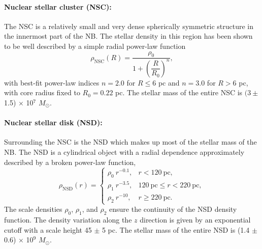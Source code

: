 \documentclass[doublespace,nopageskip]{VTthesis} %
\begin{document}
\paragraph{Nuclear stellar cluster (NSC):} The NSC is a relatively small and very dense spherically symmetric structure in the innermost part of the NB. The stellar density in this region has been shown~\cite{2002A&A...384..112L} to be well described by a simple radial power-law function
\begin{equation}\label{eq:NSC}
  \rho_{\text{NSC}}(R)=\dfrac{\rho_0}{1+\left(\dfrac{R}{R_0}\right)^{n}},
\end{equation}
with best-fit power-law indices $n = 2.0$ for $R \leq 6$ pc and $n = 3.0$ for $R > 6$ pc, with core radius fixed to $R_0 = 0.22$ pc. The stellar mass of the entire NSC is $(3\pm$ 1.5) $\times$ 10$^7$ $M_\odot$.

\paragraph{Nuclear stellar disk (NSD):} Surrounding the NSC is the NSD which makes up most of the stellar mass of the NB. The NSD is a cylindrical object with a radial dependence approximately described by a broken power-law function,
\begin{equation}\label{eq:NSD}
  \rho_{\text{NSD}}(r) = \begin{cases}
    \rho_0\ r^{-0.1}, & r < 120\ \text{pc},\\
    \rho_1\ r^{-3.5}, & 120\ \text{pc} \leq r < 220\ \text{pc},\\
    \rho_2\ r^{-10}, & r \geq 220\ \text{pc}.
  \end{cases}
\end{equation}
The scale densities $\rho_0$, $\rho_1$, and $\rho_2$ ensure the continuity of the NSD density function. The density variation along the $z$ direction is given by an exponential cutoff with a scale height 45 $\pm$ 5 pc. The stellar mass of the entire NSD is (1.4 $\pm$ 0.6) $\times$ 10$^9$ $M_\odot$.
\end{document}
